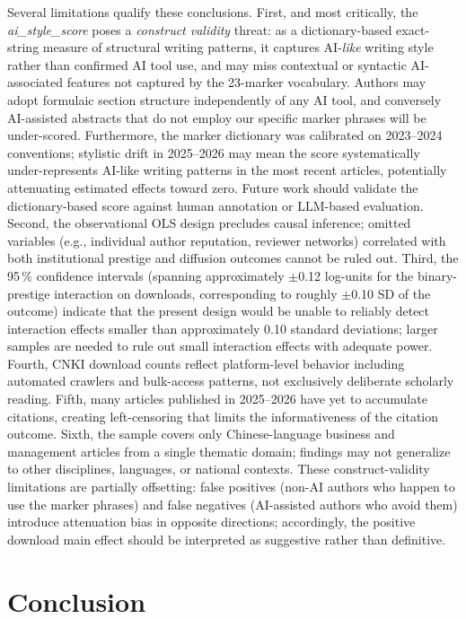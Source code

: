 \documentclass[12pt,a4paper]{article}
\begin{document}
Several limitations qualify these conclusions.
First, and most critically, the \textit{ai\_style\_score} poses a
\textit{construct validity} threat: as a dictionary-based exact-string
measure of structural writing patterns, it captures AI-\textit{like}
writing style rather than confirmed AI tool use, and may miss
contextual or syntactic AI-associated features not captured by the
23-marker vocabulary.
Authors may adopt formulaic section structure independently of any AI
tool, and conversely AI-assisted abstracts that do not employ
our specific marker phrases will be under-scored.
Furthermore, the marker dictionary was calibrated on 2023--2024
conventions; stylistic drift in 2025--2026 may mean the score
systematically under-represents AI-like writing patterns in the most
recent articles, potentially attenuating estimated effects toward zero.
Future work should validate the dictionary-based score against
human annotation or LLM-based evaluation.
Second, the observational OLS design precludes causal inference;
omitted variables (e.g., individual author reputation, reviewer networks)
correlated with both institutional prestige and diffusion outcomes
cannot be ruled out.
Third, the 95\,\% confidence intervals (spanning approximately
$\pm$0.12 log-units for the binary-prestige interaction on downloads,
corresponding to roughly $\pm$0.10 SD of the outcome)
indicate that the present design would be unable to reliably detect
interaction effects smaller than approximately 0.10 standard deviations;
larger samples are needed to rule out small interaction effects with
adequate power.
Fourth, CNKI download counts reflect platform-level behavior including
automated crawlers and bulk-access patterns, not exclusively deliberate
scholarly reading.
Fifth, many articles published in 2025--2026 have yet to accumulate
citations, creating left-censoring that limits the informativeness of
the citation outcome.
Sixth, the sample covers only Chinese-language business and management
articles from a single thematic domain; findings may not generalize
to other disciplines, languages, or national contexts.
These construct-validity limitations are partially offsetting: false
positives (non-AI authors who happen to use the marker phrases) and
false negatives (AI-assisted authors who avoid them) introduce
attenuation bias in opposite directions; accordingly, the positive
download main effect should be interpreted as suggestive rather
than definitive.

\section{Conclusion}
\label{sec:conclusion}
\end{document}
